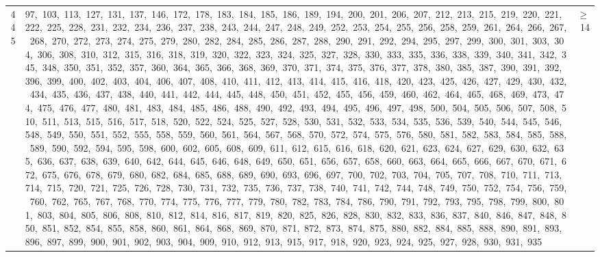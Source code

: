 \begin{longtable}{c|p{}|r}
445 & 97,\ 103,\ 113,\ 127,\ 131,\ 137,\ 146,\ 172,\ 178,\ 183,\ 184,\ 185,\ 186,\ 189,\ 194,\ 200,\ 201,\ 206,\ 207,\ 212,\ 213,\ 215,\ 219,\ 220,\ 221,\ 222,\ 225,\ 228,\ 231,\ 232,\ 234,\ 236,\ 237,\ 238,\ 243,\ 244,\ 247,\ 248,\ 249,\ 252,\ 253,\ 254,\ 255,\ 256,\ 258,\ 259,\ 261,\ 264,\ 266,\ 267,\ 268,\ 270,\ 272,\ 273,\ 274,\ 275,\ 279,\ 280,\ 282,\ 284,\ 285,\ 286,\ 287,\ 288,\ 290,\ 291,\ 292,\ 294,\ 295,\ 297,\ 299,\ 300,\ 301,\ 303,\ 304,\ 306,\ 308,\ 310,\ 312,\ 315,\ 316,\ 318,\ 319,\ 320,\ 322,\ 323,\ 324,\ 325,\ 327,\ 328,\ 330,\ 333,\ 335,\ 336,\ 338,\ 339,\ 340,\ 341,\ 342,\ 345,\ 348,\ 350,\ 351,\ 352,\ 357,\ 360,\ 364,\ 365,\ 366,\ 368,\ 369,\ 370,\ 371,\ 374,\ 375,\ 376,\ 377,\ 378,\ 380,\ 385,\ 387,\ 390,\ 391,\ 392,\ 396,\ 399,\ 400,\ 402,\ 403,\ 404,\ 406,\ 407,\ 408,\ 410,\ 411,\ 412,\ 413,\ 414,\ 415,\ 416,\ 418,\ 420,\ 423,\ 425,\ 426,\ 427,\ 429,\ 430,\ 432,\ 434,\ 435,\ 436,\ 437,\ 438,\ 440,\ 441,\ 442,\ 444,\ 445,\ 448,\ 450,\ 451,\ 452,\ 455,\ 456,\ 459,\ 460,\ 462,\ 464,\ 465,\ 468,\ 469,\ 473,\ 474,\ 475,\ 476,\ 477,\ 480,\ 481,\ 483,\ 484,\ 485,\ 486,\ 488,\ 490,\ 492,\ 493,\ 494,\ 495,\ 496,\ 497,\ 498,\ 500,\ 504,\ 505,\ 506,\ 507,\ 508,\ 510,\ 511,\ 513,\ 515,\ 516,\ 517,\ 518,\ 520,\ 522,\ 524,\ 525,\ 527,\ 528,\ 530,\ 531,\ 532,\ 533,\ 534,\ 535,\ 536,\ 539,\ 540,\ 544,\ 545,\ 546,\ 548,\ 549,\ 550,\ 551,\ 552,\ 555,\ 558,\ 559,\ 560,\ 561,\ 564,\ 567,\ 568,\ 570,\ 572,\ 574,\ 575,\ 576,\ 580,\ 581,\ 582,\ 583,\ 584,\ 585,\ 588,\ 589,\ 590,\ 592,\ 594,\ 595,\ 598,\ 600,\ 602,\ 605,\ 608,\ 609,\ 611,\ 612,\ 615,\ 616,\ 618,\ 620,\ 621,\ 623,\ 624,\ 627,\ 629,\ 630,\ 632,\ 635,\ 636,\ 637,\ 638,\ 639,\ 640,\ 642,\ 644,\ 645,\ 646,\ 648,\ 649,\ 650,\ 651,\ 656,\ 657,\ 658,\ 660,\ 663,\ 664,\ 665,\ 666,\ 667,\ 670,\ 671,\ 672,\ 675,\ 676,\ 678,\ 679,\ 680,\ 682,\ 684,\ 685,\ 688,\ 689,\ 690,\ 693,\ 696,\ 697,\ 700,\ 702,\ 703,\ 704,\ 705,\ 707,\ 708,\ 710,\ 711,\ 713,\ 714,\ 715,\ 720,\ 721,\ 725,\ 726,\ 728,\ 730,\ 731,\ 732,\ 735,\ 736,\ 737,\ 738,\ 740,\ 741,\ 742,\ 744,\ 748,\ 749,\ 750,\ 752,\ 754,\ 756,\ 759,\ 760,\ 762,\ 765,\ 767,\ 768,\ 770,\ 774,\ 775,\ 776,\ 777,\ 779,\ 780,\ 782,\ 783,\ 784,\ 786,\ 790,\ 791,\ 792,\ 793,\ 795,\ 798,\ 799,\ 800,\ 801,\ 803,\ 804,\ 805,\ 806,\ 808,\ 810,\ 812,\ 814,\ 816,\ 817,\ 819,\ 820,\ 825,\ 826,\ 828,\ 830,\ 832,\ 833,\ 836,\ 837,\ 840,\ 846,\ 847,\ 848,\ 850,\ 851,\ 852,\ 854,\ 855,\ 858,\ 860,\ 861,\ 864,\ 868,\ 869,\ 870,\ 871,\ 872,\ 873,\ 874,\ 875,\ 880,\ 882,\ 884,\ 885,\ 888,\ 890,\ 891,\ 893,\ 896,\ 897,\ 899,\ 900,\ 901,\ 902,\ 903,\ 904,\ 909,\ 910,\ 912,\ 913,\ 915,\ 917,\ 918,\ 920,\ 923,\ 924,\ 925,\ 927,\ 928,\ 930,\ 931,\ 935 & $\ge$ 14 \\

\end{longtable}
